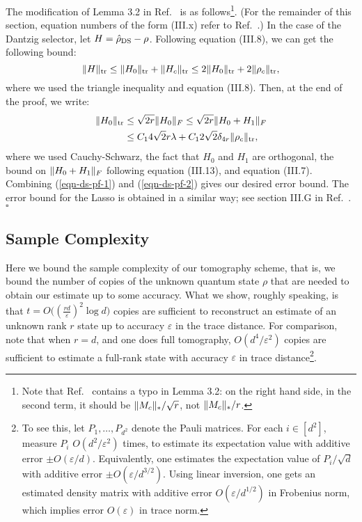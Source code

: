 The modification of Lemma 3.2 in Ref.~\cite{Candes2011} is as follows\footnote{Note that Ref.~\cite{Candes2011} contains a typo in Lemma 3.2:  on the right hand side, in the second term, it should be $\lVert M_c\rVert_*/\sqrt{r}$, not $\lVert M_c\rVert_*/r$.}.  (For the remainder of this section, equation numbers of the form (III.x) refer to Ref.~\cite{Candes2011}.)  In the case of the Dantzig selector, let $H = \hat{\rho}_{\mathrm{DS}} - \rho$.  Following equation (III.8), we can get the following bound:  
\begin{equation}\label{eqn-ds-pf-1}
	\lVert H\rVert_{\mathrm{tr}} \leq \lVert H_0\rVert_{\mathrm{tr}} + \lVert H_c\rVert_{\mathrm{tr}} \leq 2\lVert H_0\rVert_{\mathrm{tr}} + 2\lVert\rho_c\rVert_{\mathrm{tr}}, 
\end{equation}
where we used the triangle inequality and equation (III.8).  Then, at the end of the proof, we write:
\begin{equation}\label{eqn-ds-pf-2}
	\begin{split}
	\lVert H_0\rVert_{\mathrm{tr}} &\leq \sqrt{2r} \lVert H_0\rVert_F \leq \sqrt{2r} \lVert H_0+H_1\rVert_F \\
	&\leq C_1 4\sqrt{2} r \lambda + C_1 2\sqrt{2} \delta_{4r} \lVert\rho_c\rVert_{\mathrm{tr}}, 
	\end{split}
\end{equation}
where we used Cauchy-Schwarz, the fact that $H_0$ and $H_1$ are orthogonal, the bound on $\lVert H_0+H_1\rVert_F$ following equation (III.13), and equation (III.7).  Combining (\ref{eqn-ds-pf-1}) and (\ref{eqn-ds-pf-2}) gives our desired error bound.  The error bound for the Lasso is obtained in a similar way; see section III.G in Ref.~\cite{Candes2011}.  $\square$


\subsection{Sample Complexity}


Here we bound the sample complexity of our tomography scheme, that is, we bound the number of copies of the unknown quantum state $\rho$ that are needed to obtain our estimate up to some accuracy. What we show, roughly speaking, is that $t = O\bigl((\tfrac{rd}{\varepsilon})^2 \log d\bigr)$ copies are sufficient to reconstruct an estimate of an unknown rank $r$ state up to accuracy $\varepsilon$ in the trace distance. For comparison, note that when $r = d$, and one does full tomography, $O(d^4/\varepsilon^2)$ copies are sufficient to estimate a full-rank state with accuracy $\varepsilon$ in trace distance\footnote{To see this, let $P_1,\ldots,P_{d^2}$ denote the Pauli matrices. For each $i \in [d^2]$, measure $P_i$ $O(d^2/\varepsilon^2)$ times, to estimate its expectation value with additive error $\pm O(\varepsilon/d)$. Equivalently, one estimates the expectation value of $P_i/\sqrt{d}$ with additive error $\pm O(\varepsilon/d^{3/2})$. Using linear inversion, one gets an estimated density matrix with additive error $O(\varepsilon/d^{1/2})$ in Frobenius norm, which implies error $O(\varepsilon)$ in trace norm.}.

